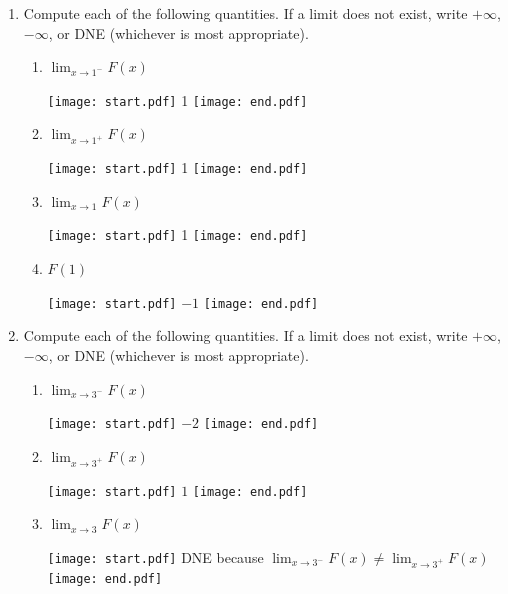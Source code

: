 \documentclass[12pt]{article}
\begin{document}
\begin{enumerate}

\item Compute each of the following quantities.  If a limit does not exist, write $+\infty$, $-\infty$, or DNE (whichever is most appropriate). 

\begin{enumerate}

\item $\displaystyle \lim_{x \rightarrow 1^{-}}{F(x)}$

\texttt{[image: start.pdf]}
{{1}}
\texttt{[image: end.pdf]}


\item $\displaystyle \lim_{x \rightarrow 1^{+}}{F(x)}$

\texttt{[image: start.pdf]}
{{1}}
\texttt{[image: end.pdf]}


\item $\displaystyle \lim_{x \rightarrow 1}{F(x)}$

\texttt{[image: start.pdf]}
{{1}}
\texttt{[image: end.pdf]}


\item $F(1)$

\texttt{[image: start.pdf]}
{{$-1$}}
\texttt{[image: end.pdf]}


\end{enumerate}

\newpage

\item Compute each of the following quantities.  If a limit does not exist, write $+\infty$, $-\infty$, or DNE (whichever is most appropriate). 

\begin{enumerate}

\item $\displaystyle \lim_{x \rightarrow 3^{-}}{F(x)}$

\texttt{[image: start.pdf]}
{{$-2$}}
\texttt{[image: end.pdf]}


\item $\displaystyle \lim_{x \rightarrow 3^{+}}{F(x)}$

\texttt{[image: start.pdf]}
{{$1$}}
\texttt{[image: end.pdf]}


\item $\displaystyle \lim_{x \rightarrow 3}{F(x)}$

\texttt{[image: start.pdf]}
{{DNE because $\displaystyle \lim_{x \rightarrow 3^{-}}{F(x)} \neq \lim_{x \rightarrow 3^{+}}{F(x)}$}}
\texttt{[image: end.pdf]}



\end{enumerate}
\end{enumerate}
\end{document}
